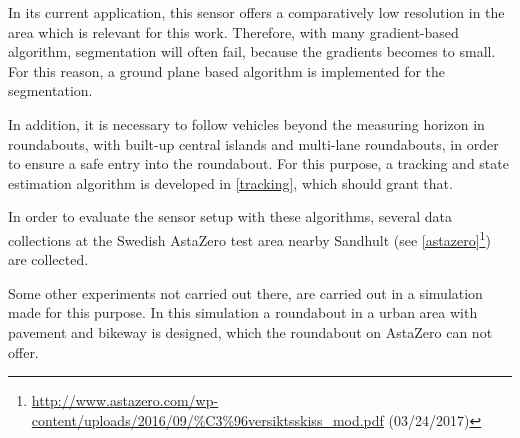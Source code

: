 \documentclass[11pt,oneside,openright]{mpreport}
\begin{document}

In its current application, this sensor offers a comparatively low resolution in the area which is relevant for this work.
Therefore, with many gradient-based algorithm, segmentation will often fail, because the gradients becomes to small.
For this reason, a ground plane based algorithm is implemented for the segmentation.


In addition, it is necessary to follow vehicles beyond the measuring horizon in roundabouts, with built-up central islands and multi-lane roundabouts, 
in order to ensure a safe entry into the roundabout.
For this purpose, a tracking and state estimation algorithm is developed in \cref{tracking}, which should grant that.


In order to evaluate the sensor setup with these algorithms, several data collections at the Swedish AstaZero test area nearby Sandhult
(see \cref{astazero}\footnote{\url{http://www.astazero.com/wp-content/uploads/2016/09/\%C3\%96versiktsskiss_mod.pdf} (03/24/2017)}) are collected.

Some other experiments not carried out there, are carried out in a simulation made for this purpose. In this simulation a roundabout in a urban area 
with pavement and bikeway is designed, which the roundabout on AstaZero can not offer.
\end{document}
